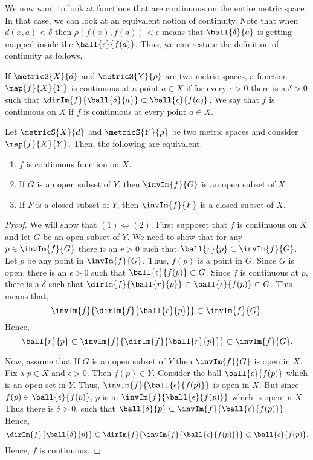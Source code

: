 We now want to look at functions that are continuous on the entire metric space. In that case, we can look at
an equivalent notion of continuity. Note that when $d(x,a) < \delta$ then $\rho(f(x),f(a)) < \epsilon$ 
means that $\ball{\delta}{a}$ is getting mapped inside the $\ball{\epsilon}{f(a)}$. Thus, we can restate the
definition of continuity as follows,
\begin{Proposition}
     If $\metricS{X}{d}$ and $\metricS{Y}{\rho}$ are two metric spaces, a function $\map{f}{X}{Y}$ is 
     continuous at a point $a \in X$ if for every $\epsilon > 0$ there is a $\delta > 0$ such that 
     $\dirIm{f}{\ball{\delta}{a}} \subset \ball{\epsilon}{f(a)}$. We say that $f$ is continuous on $X$ if $f$ is
    continuous at every point $a \in X$.
\end{Proposition}
\begin{Theorem}
    Let $\metricS{X}{d}$ and $\metricS{Y}{\rho}$ be two metric spaces and consider $\map{f}{X}{Y}$. Then, the
    following are equivalent.
    \begin{enumerate}
	\item
	    $f$ is continuous function on $X$.
	\item
	    If $G$ is an open subset of $Y$, then $\invIm{f}{G}$ is an open subset of $X$.
	\item
	    If $F$ is a closed subset of $Y$, then $\invIm{f}{F}$ is a closed subset of $X$.
    \end{enumerate}
\end{Theorem}
\begin{proof}
    We will show that $(1) \iff (2)$. First supposet that $f$ is continuous on $X$ and let $G$ be an open
    subset of $Y$. We need to show that for any $p \in \invIm{f}{G}$ 
    there is an $r > 0$ such that $\ball{r}{p} \subset \invIm{f}{G}$. Let $p$ be any point in $\invIm{f}{G}$.
    Thus, $f(p)$ is a point in $G$. Since $G$ is open, there is an $\epsilon > 0$ such that 
    $\ball{\epsilon}{f(p)}\subset G$. Since $f$ is continuous at $p$, there is a $\delta$ such that
    $\dirIm{f}{\ball{r}{p}} \subset \ball{\epsilon}{f(p)}\subset G$. This means that,
    \[\invIm{f}{\dirIm{f}{\ball{r}{p}}} \subset \invIm{f}{G}.\]
    Hence,
    \[\ball{r}{p} \subset \invIm{f}{\dirIm{f}{\ball{r}{p}}} \subset \invIm{f}{G}. \]

    Now, assume that If $G$ is an open subset of $Y$ then $\invIm{f}{G}$ is open in $X$. Fix a $p \in X$ and
    $\epsilon > 0$. Then $f(p) \in Y$. Consider the ball $\ball{\epsilon}{f(p)}$ which is an open set in $Y$.
    Thus, $\invIm{f}{\ball{\epsilon}{f(p)}}$ is open in $X$. But since $f(p) \in \ball{\epsilon}{f(p)}$, $p$
    is in $\invIm{f}{\ball{\epsilon}{f(p)}}$ which is open in $X$. Thus there is $\delta > 0$, such that
    $\ball{\delta}{p} \subset \invIm{f}{\ball{\epsilon}{f(p)}}$. Hence,
    \[\dirIm{f}{\ball{\delta}{p}} \subset \dirIm{f}{\invIm{f}{\ball{\epsilon}{f(p)}}} \subset 
	\ball{\epsilon}{f(p)}.\]
    Hence, $f$ is continuous.
\end{proof}

